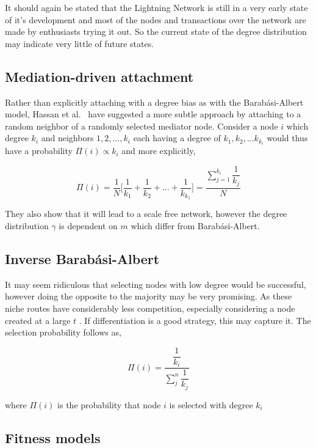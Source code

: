 It should again be stated that the \gls{Lightning Network} is still in a very early state of it's development and most of the nodes and transactions over the network are made by enthusiasts trying it out. So the current state of the \gls{degree distribution} may indicate very little of future states. 

\subsection{Mediation-driven attachment}

Rather than explicitly attaching with a degree bias as with the Barabási-Albert model, Hassan et al.~\cite{hassan:islam:haque:mediation} have suggested a more subtle approach by attaching to a random neighbor of a randomly selected mediator node. Consider a node $i$ which degree $k_i$ and neighbors $1,2,...,k_i$ each having a degree of $k_1, k_2, ... k_{k_i}$ would thus have a probability $\Pi(i) \propto k_i$ and more explicitly,

\[ \Pi(i) = \dfrac{1}{N} \bigg\lbrack \dfrac{1}{k_1} + \dfrac{1}{k_2} + ... + \dfrac{1}{k_{k_1}} \bigg\rbrack = \dfrac{\sum_{j=1}^{k_i}\dfrac{1}{k_j}}{N} \]

They also show that it will lead to a scale free network, however the \gls{degree distribution} $\gamma$ is dependent on $m$ which differ from Barabási-Albert.

\subsection{Inverse Barabási-Albert}


It may seem ridiculous that selecting nodes with low degree would be successful, however doing the opposite to the majority may be very promising. As these niche routes have considerably less competition, especially considering a node created at a large $t$ . If differentiation is a good strategy, this may capture it. The selection probability follows as, 

\[ \Pi(i) =  \dfrac{\dfrac{1}{k_i}}{\sum_{j}^{n} \dfrac{1}{k_j}} \]

where $\Pi(i)$ is the probability that node $i$ is selected with degree $k_i$

\subsection{Fitness models}

